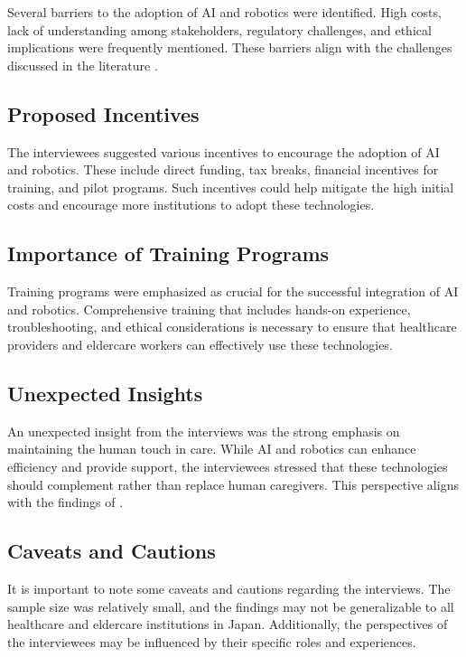 \documentclass{article} %
\begin{document}
Several barriers to the adoption of AI and robotics were identified. High costs, lack of understanding among stakeholders, regulatory challenges, and ethical implications were frequently mentioned. These barriers align with the challenges discussed in the literature \citep{park2023generative, shanahan2023role}.

\subsection{Proposed Incentives}

The interviewees suggested various incentives to encourage the adoption of AI and robotics. These include direct funding, tax breaks, financial incentives for training, and pilot programs. Such incentives could help mitigate the high initial costs and encourage more institutions to adopt these technologies.

\subsection{Importance of Training Programs}

Training programs were emphasized as crucial for the successful integration of AI and robotics. Comprehensive training that includes hands-on experience, troubleshooting, and ethical considerations is necessary to ensure that healthcare providers and eldercare workers can effectively use these technologies.

\subsection{Unexpected Insights}

An unexpected insight from the interviews was the strong emphasis on maintaining the human touch in care. While AI and robotics can enhance efficiency and provide support, the interviewees stressed that these technologies should complement rather than replace human caregivers. This perspective aligns with the findings of \citet{liu2023agentbench}.

\subsection{Caveats and Cautions}

It is important to note some caveats and cautions regarding the interviews. The sample size was relatively small, and the findings may not be generalizable to all healthcare and eldercare institutions in Japan. Additionally, the perspectives of the interviewees may be influenced by their specific roles and experiences.
\end{document}
